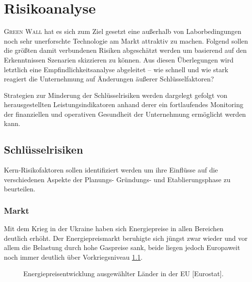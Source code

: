 \chapter{Risikoanalyse}

    \textsc{Green Wall} hat es sich zum Ziel gesetzt eine außerhalb von Laborbedingungen noch sehr unerforschte Technologie am Markt attraktiv zu machen.
    Folgend sollen die größten damit verbundenen Risiken abgeschätzt werden um basierend auf den Erkenntnissen Szenarien skizzieren zu können.
    Aus diesen Überlegungen wird letztlich eine Empfindlichkeitsanalyse abgeleitet -- wie schnell und wie stark reagiert die Unternehmung auf Änderungen äußerer Schlüsselfaktoren?\par\medskip

    Strategien zur Minderung der Schlüsselrisiken werden dargelegt gefolgt von herausgestellten Leistungsindikatoren anhand derer ein fortlaufendes Monitoring der finanziellen und operativen Gesundheit der Unternehmung ermöglicht werden kann.

    \section{Schlüsselrisiken}

        Kern-Risikofaktoren sollen identifiziert werden um ihre Einflüsse auf die verschiedenen Aspekte der Planungs- Gründungs- und Etablierungsphase zu beurteilen.

        \subsection{Markt}

            Mit dem Krieg in der Ukraine haben sich Energiepreise in allen Bereichen deutlich erhöht.
            Der Energiepreismarkt beruhigte sich jüngst zwar wieder und vor allem die Belastung durch hohe Gaspreise sank, beide liegen jedoch Europaweit noch immer deutlich über Vorkriegsniveau \cref{fig:energiepreise}.

            \begin{figure}[h]
                \centering
                
                \caption[Energiepreisentwicklung ausgewählter Länder in der EU]{Energiepreisentwicklung ausgewählter Länder in der EU [Eurostat].}\label{fig:energiepreise}
            \end{figure}


